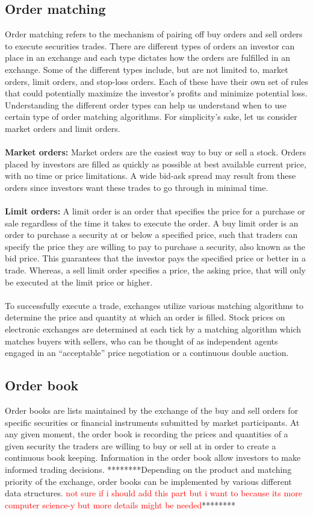 \documentclass{article}
\newcommand{\todo}{\textcolor{red}}
\begin{document}
\subsection{Order matching}
Order matching refers to the mechanism of pairing off buy orders and sell orders to execute securities trades. There are different types of orders an investor can place in an exchange and each type dictates how the orders are fulfilled in an exchange. Some of the different types include, but are not limited to, market orders, limit orders, and stop-loss orders. Each of these have their own set of rules that could potentially maximize the investor's profits and minimize potential loss. Understanding the different order types can help us understand when to use certain type of order matching algorithms. For simplicity's sake, let us consider market orders and limit orders. \\\\
\textbf{Market orders:} Market orders are the easiest way to buy or sell a stock. Orders placed by investors are filled as quickly as possible at best available current price, with no time or price limitations. A wide bid-ask spread may result from these orders since investors want these trades to go through in minimal time.\\\\
\textbf{Limit orders:} A limit order is an order that specifies the price for a purchase or sale regardless of the time it takes to execute the order. A buy limit order is an order to purchase a security at or below a specified price, such that traders can specify the price they are willing to pay to purchase a security, also known as the bid price. This guarantees that the investor pays the specified price or better in a trade. Whereas, a sell limit order specifies a price, the asking price, that will only be executed at the limit price or higher.\\\\
To successfully execute a trade, exchanges utilize various matching algorithms to determine the price and quantity at which an order is filled. Stock prices on electronic exchanges are determined at each tick by a matching algorithm which matches buyers with sellers, who can be thought of as independent agents engaged in an “acceptable” price negotiation or a continuous double auction.

\subsection{Order book} 
Order books are lists maintained by the exchange of the buy and sell orders for specific securities or financial instruments submitted by market participants. At any given moment, the order book is recording the prices and quantities of a given security the traders are willing to buy or sell at in order to create a continuous book keeping. Information in the order book allow investors to make informed trading decisions. ********Depending on the product and matching priority of the exchange, order books can be implemented by various different data structures. \todo{not sure if i should add this part but i want to because its more computer science-y but more details might be needed}******** 
\end{document}
